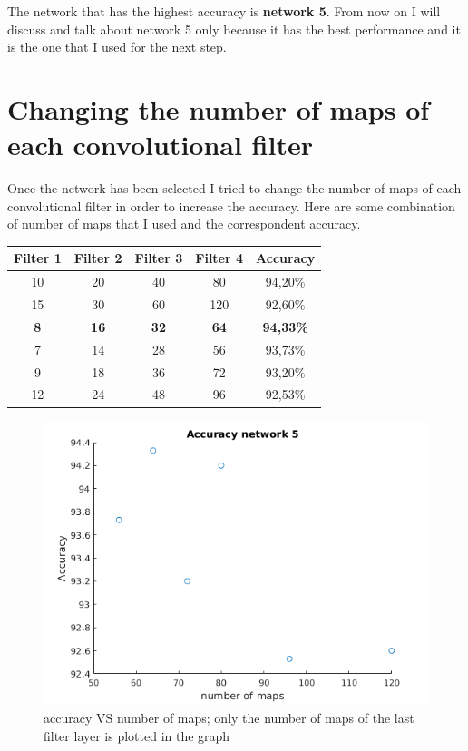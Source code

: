 \documentclass[]{report}
\begin{document}
\newpage
The network that has the highest accuracy is \textbf{network 5}. From now on I will discuss and talk about network 5 only because it has the best performance and it is the one that I used for the next step. 

\section{Changing the number of maps of each convolutional filter}

Once the network has been selected I tried to change the number of maps of each convolutional filter in order to increase the accuracy. Here are some combination of number of maps that I used and the correspondent accuracy.

\begin{table} [h]
\begin{center}
\begin{tabular}{|c|c|c|c|c|}
 \hline
 \textbf{Filter 1} & \textbf{Filter 2} & \textbf{Filter 3} & \textbf{Filter 4} & \textbf{Accuracy} \\ \hline
 10 & 20 & 40  & 80  & 94,20\%  \\ \hline
 15 & 30 & 60  & 120  & 92,60\%  \\ \hline
 \textbf{8} & \textbf{16} & \textbf{32}  & \textbf{64}  & \textbf{94,33\%}  \\ \hline
 7 & 14 & 28  & 56  & 93,73\%  \\ \hline
 9 & 18 & 36  & 72  & 93,20\%  \\ \hline
 12 & 24 & 48  & 96  & 92,53\%  \\ \hline
 
\end{tabular}
\end{center} 
\end{table}
 
\begin{figure}[h]
	\begin{center}
		\includegraphics[scale=0.4]{maps_accuracy.png}
		\caption{accuracy VS number of maps; only the number of maps of the last filter layer is plotted in the graph}
		\label{fig:accuracyMaps}
	\end{center}
\end{figure}
\end{document}
